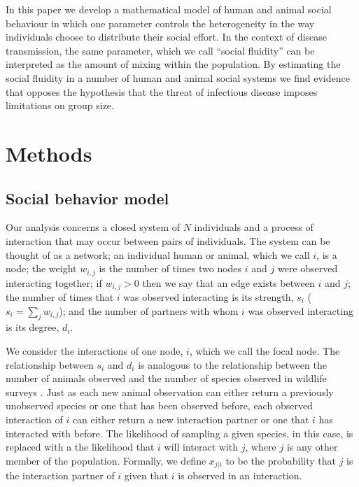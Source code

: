 \documentclass[10pt]{article}
\begin{document}
\begin{multicols}{2}
In this paper we develop a mathematical model of human and animal social behaviour in which one parameter controls the heterogeneity in the way individuals choose to distribute their social effort. In the context of disease transmission, the same parameter, which we call ``social fluidity'' can be interpreted as the amount of mixing within the population. By estimating the social fluidity in a number of human and animal social systems we find evidence that opposes the hypothesis that the threat of infectious disease imposes limitations on group size.  

\section{Methods}
\subsection{Social behavior model}
\label{social_behavior}
Our analysis concerns a closed system of $N$ individuals and a process of interaction that may occur between pairs of individuals. The system can be thought of as a network; an individual human or animal, which we call $i$, is a node; the weight $w_{i,j}$ is the number of times two nodes $i$ and $j$ were observed interacting together; if $w_{i,j}>0$ then we say that an edge exists between $i$ and $j$; the number of times that $i$ was observed interacting is its strength, $s_{i}$ ($s_{i}=\sum_{j}w_{i,j}$); and the number of partners with whom $i$ was observed interacting is its degree, $d_{i}$. 

We consider the interactions of one node, $i$, which we call the focal node. The relationship between $s_{i}$ and $d_{i}$ is analogous to the relationship between the number of animals observed and the number of species observed in wildlife surveys \cite{hurlbert1971nonconcept, burnham1978estimation, colwell2004interpolating}. Just as each new animal observation can either return a previously unobserved species or one that has been observed before, each observed interaction of $i$ can either return a new interaction partner or one that $i$ has interacted with before. The likelihood of sampling a given species, in this case, is replaced with a the likelihood that $i$ will interact with $j$, where $j$ is any other member of the population. Formally, we define $x_{j|i}$ to be the probability that $j$ is the interaction partner of $i$ given that $i$ is observed in an interaction. 


\end{multicols}
\end{document}
